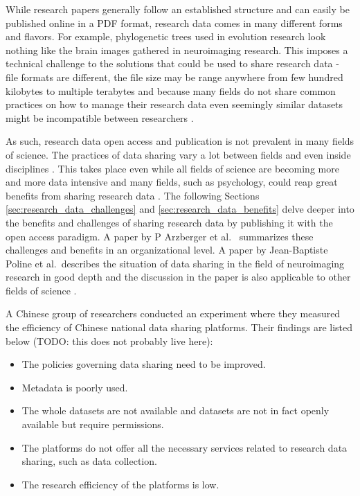 While research papers generally follow an established structure and can easily
be published online in a PDF format, research data comes in many different
forms and flavors. For example, phylogenetic trees used in evolution
research look nothing like the brain images gathered in neuroimaging
research. This imposes a technical challenge to the solutions that
could be used to share research data - file formats are different, the
file size may be range anywhere from few hundred kilobytes to multiple
terabytes and because many fields do not share common practices on how to
manage their research data even seemingly similar datasets might be
incompatible between researchers
\cite{whitlock2011data, DBLP:journals/fini/PolineBGGHHHHKMPSAK12}.

As such, research data open access and publication is not prevalent in many
fields of science. The practices of data sharing vary a lot between fields and
even inside disciplines \cite{DBLP:journals/jasis/Borgman12, cragin2010data}.
This takes place even while all fields of science are
becoming more and more data intensive and many fields, such as psychology,
could reap great benefits from sharing research data
\cite{DBLP:books/ms/4paradigm09, wicherts2006poor}. The following
Sections \ref{sec:research_data_challenges} and \ref{sec:research_data_benefits}
delve deeper into the benefits and challenges of sharing research data by
publishing it with the open access paradigm. A paper by P Arzberger et
al.{\ }\cite{DBLP:journals/datascience/ArzbergerSBBCLMUW04} summarizes these
challenges and benefits in an organizational level. A paper by Jean-Baptiste
Poline et al.{\ }describes the situation of data sharing in the field of
neuroimaging research in good depth and the discussion in the paper is also
applicable to other fields of science
\cite{DBLP:journals/fini/PolineBGGHHHHKMPSAK12}.

A Chinese group of researchers conducted an experiment where they measured the
efficiency of Chinese national data sharing platforms. Their findings are
listed below \cite{DBLP:journals/lht/SiLZXHLX15} (TODO: this does not probably
live here):

\begin{itemize}
    \item The policies governing data sharing need to be improved.
    \item Metadata is poorly used.
    \item The whole datasets are not available and datasets are not in fact
          openly available but require permissions.
    \item The platforms do not offer all the necessary services related to
          research data sharing, such as data collection.
    \item The research efficiency of the platforms is low.
\end{itemize}

